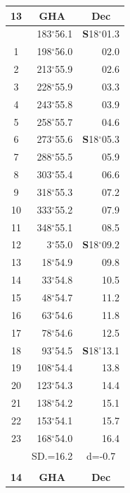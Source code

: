 \documentclass[10pt, a4paper]{report}
\begin{document}
\begin{scriptsize}
\noindent
\begin{tabular*}{0.2\textwidth}[t]{@{\extracolsep{\fill}}|c|rr|}
\hline
\multicolumn{1}{|c|}{\rule{0pt}{2.6ex}\textbf{13}} & \multicolumn{1}{c}{\textbf{GHA}} & \multicolumn{1}{c|}{\textbf{Dec}}\\
\hline\rule{0pt}{2.6ex}\noindent
0 & 183$^\circ$56.1 & \textbf{S}18$^\circ$01.3\\
1 & 198$^\circ$56.0 & 02.0\\
2 & 213$^\circ$55.9 & 02.6\\
3 & 228$^\circ$55.9 & \raisebox{0.24ex}{\boldmath$\cdot$~\boldmath$\cdot$~~}03.3\\
4 & 243$^\circ$55.8 & 03.9\\
5 & 258$^\circ$55.7 & 04.6\\[2Pt]
6 & 273$^\circ$55.6 & \textbf{S}18$^\circ$05.3\\
7 & 288$^\circ$55.5 & 05.9\\
8 & 303$^\circ$55.4 & 06.6\\
9 & 318$^\circ$55.3 & \raisebox{0.24ex}{\boldmath$\cdot$~\boldmath$\cdot$~~}07.2\\
10 & 333$^\circ$55.2 & 07.9\\
11 & 348$^\circ$55.1 & 08.5\\[2Pt]
12 & 3$^\circ$55.0 & \textbf{S}18$^\circ$09.2\\
13 & 18$^\circ$54.9 & 09.8\\
14 & 33$^\circ$54.8 & 10.5\\
15 & 48$^\circ$54.7 & \raisebox{0.24ex}{\boldmath$\cdot$~\boldmath$\cdot$~~}11.2\\
16 & 63$^\circ$54.6 & 11.8\\
17 & 78$^\circ$54.6 & 12.5\\[2Pt]
18 & 93$^\circ$54.5 & \textbf{S}18$^\circ$13.1\\
19 & 108$^\circ$54.4 & 13.8\\
20 & 123$^\circ$54.3 & 14.4\\
21 & 138$^\circ$54.2 & \raisebox{0.24ex}{\boldmath$\cdot$~\boldmath$\cdot$~~}15.1\\
22 & 153$^\circ$54.1 & 15.7\\
23 & 168$^\circ$54.0 & 16.4\\
\hline
\rule{0pt}{2.4ex} & \multicolumn{1}{c}{SD.=16.2} & \multicolumn{1}{c|}{d=-0.7}\\
\hline
\multicolumn{1}{c}{}\\[-0.5ex]\hline
\multicolumn{1}{|c|}{\rule{0pt}{2.6ex}\textbf{14}} & \multicolumn{1}{c}{\textbf{GHA}} & \multicolumn{1}{c|}{\textbf{Dec}}\\

\end{tabular*}
\end{scriptsize}
\end{document}
